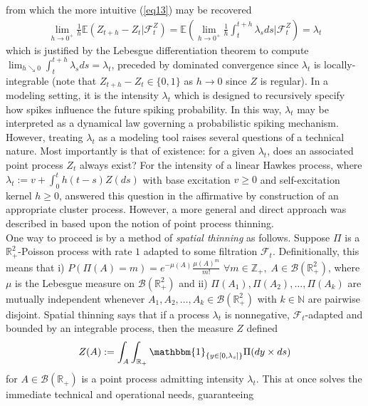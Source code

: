 \documentclass[12pt, oneside]{report}
\newcommand{\E}{\mathbb{E}}
\newcommand{\mbb}[1]{\mathbb{#1}}
\newcommand{\1}[1]{\mathbbm{1}_{\{#1\}}}
\newcommand{\mc}[1]{\mathcal{#1}}
\theoremstyle{definition}
\begin{document}
from which the more intuitive (\ref{eq13}) may be recovered
\begin{align*}
    \lim_{h\rightarrow 0^+}\frac{1}{h}\E\left(Z_{t+h}-Z_t|\mc{F}_t^Z\right)=\E\left(\lim_{h\rightarrow 0^+}\frac{1}{h}\int_t^{t+h}\lambda_sds\bigg|\mc{F}^Z_t\right)=\lambda_t
\end{align*}
which is justified by the Lebesgue differentiation theorem to compute
$\lim_{h\searrow 0}\int_t^{t+h}\lambda_sds=\lambda_t$, preceded by
dominated convergence since $\lambda_t$ is locally-integrable (note that
$Z_{t+h}-Z_t\in\{0,1\}$ as $h\rightarrow 0$ since $Z$ is regular). In a modeling
setting, it is the intensity $\lambda_t$ which is designed to recursively
specify how spikes influence the future spiking probability. In this way,
$\lambda_t$ may be interpreted as a dynamical law governing a probabilistic
spiking mechanism. However, treating $\lambda_t$ as a modeling tool raises
several questions of a technical nature. Most importantly is that of existence:
for a given $\lambda_t$, does an associated point process $Z_t$ always exist?
For the intensity of a linear Hawkes process, where
$\lambda_t:=v+\int_0^th(t-s)Z(ds)$ with base excitation $v\geq0$ and
self-excitation kernel $h\geq 0$, \cite{Hawkes_Oakes_1974} answered this question
in the affirmative by construction of an appropriate cluster process. However, a
more general and direct approach was described in \cite{Ogata_1981} based upon the
notion of point process thinning.\\[5pt]
\indent One way to proceed is by a method of \textit{spatial thinning} \cite[theorem B.11]{Chevallier_Caceres_Doumic_Reynaud_Bouret_2015} as follows. Suppose $\Pi$ is a $\mbb{R}_+^2$-Poisson process with rate $1$
adapted to some filtration $\mc{F}_t$. Definitionally, this means that i)
$P(\Pi(A)=m)=e^{-\mu(A)}\tfrac{\mu(A)^m}{m!}$ $\forall
m\in\mbb{Z}_+,\;A\in\mc{B}(\mbb{R}^2_+)$, where $\mu$ is the Lebesgue measure on
$\mc{B}(\mbb{R}_+^2)$ and ii) $\Pi(A_1), \Pi(A_2),\dots,\Pi(A_k)$ are mutually
independent whenever $A_1,A_2,\dots,A_k\in\mc{B}(\mbb{R}_+^2)$ with $k\in\mbb{N}$ are pairwise
disjoint. Spatial thinning says that if a process $\lambda_t$ is
nonnegative, $\mc{F}_t$-adapted and bounded by an integrable process, then the
measure $Z$ defined
\begin{align*}
    Z(A):=\int_{A}\int_{\mbb{R}_+}\1{y\in[0,\lambda_s]}\Pi(dy\times ds)
\end{align*}
for $A\in\mc{B}(\mbb{R}_+)$ is a point process admitting intensity $\lambda_t$.
This at once solves the immediate technical and operational needs, guaranteeing
\end{document}

